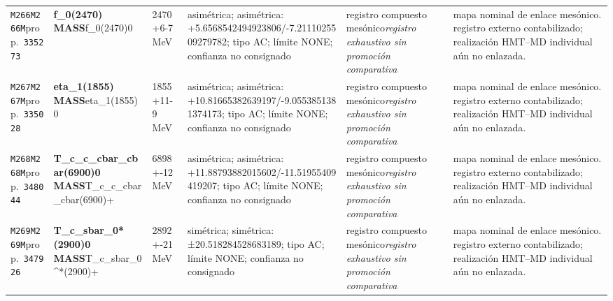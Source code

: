 \begin{landscape}
\begin{longtable}{L{1.85cm}L{4.45cm}L{2.35cm}L{4.05cm}L{3.35cm}L{7.15cm}}
\texttt{M266}\newline \texttt{M266M}\newline prop.\ \texttt{335273} & \textbf{f\_\allowbreak{}0(2470) MASS}\newline f\_\allowbreak{}0(2470)0 & 2470+6-7\,MeV & asimétrica; asimétrica: +5.6568542494923806/-7.2111025509279782; tipo AC; límite NONE; confianza no consignado & registro compuesto mesónico\newline \emph{registro exhaustivo sin promoción comparativa} & mapa nominal de enlace mesónico. registro externo contabilizado; realización HMT--MD individual aún no enlazada. \\
\texttt{M267}\newline \texttt{M267M}\newline prop.\ \texttt{335028} & \textbf{eta\_\allowbreak{}1(1855) MASS}\newline eta\_\allowbreak{}1(1855)0 & 1855+11-9\,MeV & asimétrica; asimétrica: +10.81665382639197/-9.0553851381374173; tipo AC; límite NONE; confianza no consignado & registro compuesto mesónico\newline \emph{registro exhaustivo sin promoción comparativa} & mapa nominal de enlace mesónico. registro externo contabilizado; realización HMT--MD individual aún no enlazada. \\
\texttt{M268}\newline \texttt{M268M}\newline prop.\ \texttt{348044} & \textbf{T\_\allowbreak{}c\_\allowbreak{}c\_\allowbreak{}cbar\_\allowbreak{}cbar(6900)0 MASS}\newline T\_\allowbreak{}c\_\allowbreak{}c\_\allowbreak{}cbar\_\allowbreak{}cbar(6900)+ & 6898+-12\,MeV & asimétrica; asimétrica: +11.88793882015602/-11.51955409419207; tipo AC; límite NONE; confianza no consignado & registro compuesto mesónico\newline \emph{registro exhaustivo sin promoción comparativa} & mapa nominal de enlace mesónico. registro externo contabilizado; realización HMT--MD individual aún no enlazada. \\
\texttt{M269}\newline \texttt{M269M}\newline prop.\ \texttt{347926} & \textbf{T\_\allowbreak{}c\_\allowbreak{}sbar\_\allowbreak{}0*(2900)0 MASS}\newline T\_\allowbreak{}c\_\allowbreak{}sbar\_\allowbreak{}0\textasciicircum{}*(2900)+ & 2892+-21\,MeV & simétrica; simétrica: ±20.518284528683189; tipo AC; límite NONE; confianza no consignado & registro compuesto mesónico\newline \emph{registro exhaustivo sin promoción comparativa} & mapa nominal de enlace mesónico. registro externo contabilizado; realización HMT--MD individual aún no enlazada. \\

\end{longtable}
\end{landscape}
